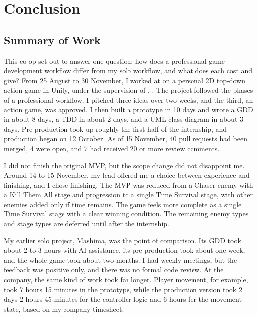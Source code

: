\chapter{Conclusion}

\section{Summary of Work}
This co-op set out to answer one question: how does a professional game development workflow differ from my solo workflow, and what does each cost and give? From 25 August to 30 November, I worked at \companyName{} on a personal 2D top-down action game in Unity, under the supervision of \supervisorName{}, \supervisorPosition{}. The project followed the phases of a professional workflow. I pitched three ideas over two weeks, and the third, an action game, was approved. I then built a prototype in 10 days and wrote a GDD in about 8 days, a TDD in about 2 days, and a UML class diagram in about 3 days. Pre-production took up roughly the first half of the internship, and production began on 12 October. As of 15 November, 40 pull requests had been merged, 4 were open, and 7 had received 20 or more review comments.

I did not finish the original MVP, but the scope change did not disappoint me. Around 14 to 15 November, my lead offered me a choice between experience and finishing, and I chose finishing. The MVP was reduced from a Chaser enemy with a Kill Them All stage and progression to a single Time Survival stage, with other enemies added only if time remains. The game feels more complete as a single Time Survival stage with a clear winning condition. The remaining enemy types and stage types are deferred until after the internship.

My earlier solo project, Mashima, was the point of comparison. Its GDD took about 2 to 3 hours with AI assistance, its pre-production took about one week, and the whole game took about two months. I had weekly meetings, but the feedback was positive only, and there was no formal code review. At the company, the same kind of work took far longer. Player movement, for example, took 7 hours 15 minutes in the prototype, while the production version took 2 days 2 hours 45 minutes for the controller logic and 6 hours for the movement state, based on my company timesheet.

